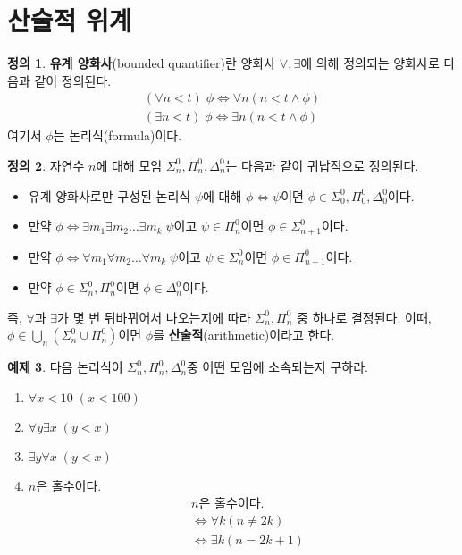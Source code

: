 \documentclass[b5paper, 11pt]{book}
\theoremstyle{definition}
\newtheorem{defn}{정의}[chapter]
\newtheorem{ex}[defn]{예제}
\begin{document}
\section{산술적 위계}
\begin{defn}
    \textbf{유계 양화사}(bounded quantifier)란 양화사 $\forall, \exists$에 의해
    정의되는 양화사로 다음과 같이 정의된다. 
    \begin{align*}
        (\forall n < t )\; \phi \Leftrightarrow \forall n (n < t \wedge \phi) \\
        (\exists n < t )\; \phi \Leftrightarrow \exists n (n < t \wedge \phi)
    \end{align*}
    여기서 $\phi$는 논리식(formula)이다. 
\end{defn}
\begin{defn}
    자연수 $n$에 대해 모임 $\Sigma_n^0, \Pi_n^0, \Delta_n^0$는 다음과 같이 귀납적으로 정의된다.
    \begin{itemize}
        \item 유계 양화사로만 구성된 논리식 $\psi$에 대해 $\phi \Leftrightarrow \psi$이면 $\phi \in 
        \Sigma_0^0, \Pi_0^0, \Delta_0^0$이다. 
        \item 만약 $\phi \Leftrightarrow \exists m_1 \exists m_2 \ldots \exists m_k \; \psi$이고
        $\psi \in \Pi_n^0$이면 $\phi \in \Sigma_{n+1}^0$이다.  
        \item 만약 $\phi \Leftrightarrow \forall m_1 \forall m_2 \ldots \forall m_k \; \psi$이고
        $\psi \in \Sigma_n^0$이면 $\phi \in \Pi_{n+1}^0$이다.  
        \item 만약 $\phi \in \Sigma_n^0, \Pi_n^0$이면 $\phi \in \Delta_n^0$이다.
    \end{itemize}
    즉, $\forall $과 $\exists$가 몇 번 뒤바뀌어서 나오는지에 따라 $\Sigma_n^0, \Pi_n^0$ 중 하나로 결정된다. 이때, $\phi \in \bigcup_n (\Sigma_n^0 \cup \Pi_n^0 )$이면 $\phi$를 \textbf{산술적}(arithmetic)이라고 한다.
\end{defn}
\begin{ex}
    다음 논리식이 $\Sigma_n^0, \Pi_n^0, \Delta_n^0$중 어떤 모임에 소속되는지 구하라.
    \begin{enumerate}
        \item $\forall x < 10 \; (x < 100)$ 
        \item $\forall y \exists x \; (y < x)$
        \item $\exists y \forall x \; (y < x)$
        \item $n$은 홀수이다.
        \begin{align*}
            &n\text{은 홀수이다.} \\ 
            &\Leftrightarrow \forall k (n \neq 2k) \\ 
            &\Leftrightarrow \exists k (n = 2k + 1)
        \end{align*}
    \end{enumerate}
\end{ex}
\end{document}
